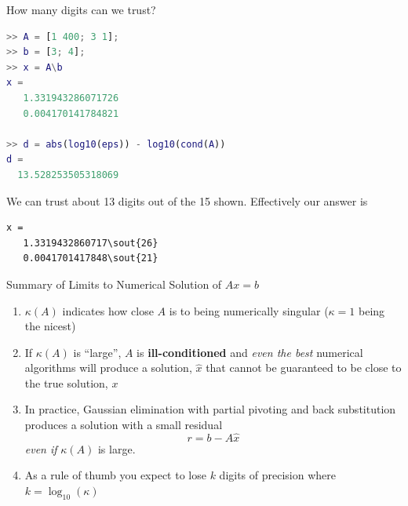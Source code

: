 \documentclass[10pt]{beamer}
\begin{document}

\begin{frame}[fragile]{How many digits can we trust?}

\begin{lstlisting}[language=matlab]
>> A = [1 400; 3 1];
>> b = [3; 4];
>> x = A\b
x =
   1.331943286071726
   0.004170141784821

>> d = abs(log10(eps)) - log10(cond(A)) 
d =
  13.528253505318069
\end{lstlisting}
We can trust about 13 digits out of the 15 shown. Effectively our answer is 
\begin{Verbatim}[commandchars=\\\{\}]
x =
   1.3319432860717\sout{26}
   0.0041701417848\sout{21}
\end{Verbatim}
\end{frame}


\begin{frame}{Summary of Limits to Numerical Solution of $Ax=b$}

\begin{enumerate}
    \item   $\kappa(A)$ indicates how close $A$ is to being numerically singular ($\kappa=1$ being the nicest)\\[5pt]
    \item   If $\kappa(A)$ is ``large'', $A$ is \textbf{ill-conditioned} and
            \emph{even the best} numerical algorithms will produce a solution,
            $\hat{x}$ that cannot be guaranteed to be close to the true
            solution, $x$\\[5pt]
    \item   In practice, Gaussian elimination with partial pivoting and
            back substitution produces a solution with a small residual
            \begin{equation*}
                r = b - A\hat{x}
            \end{equation*}
            \emph{even if} $\kappa(A)$ is large.\\[5pt]
    \item As a rule of thumb you expect to lose $k$ digits of precision where $k=\log_{10}(\kappa)$
\end{enumerate}
\end{frame}

\end{document}

